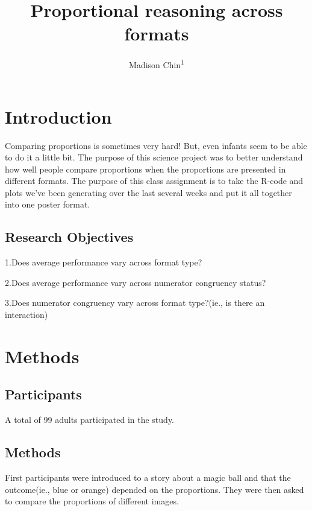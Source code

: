 \documentclass[
  man,floatsintext]{apa6}
\title{Proportional reasoning across formats}
\author{Madison Chin\textsuperscript{1}}
\date{}
\affiliation{\vspace{0.5cm}\textsuperscript{1} Rutgers University}
\begin{document}
\maketitle

\section{Introduction}\label{introduction}

Comparing proportions is sometimes very hard! But, even infants seem to be able to do it a little bit. The purpose of this science project was to better understand how well people compare proportions when the proportions are presented in different formats. The purpose of this class assignment is to take the R-code and plots we've been generating over the last several weeks and put it all together into one poster format.

\subsection{\texorpdfstring{Research Objectives }{Research Objectives  }}\label{research-objectives}

1.Does average performance vary across format type?

2.Does average performance vary across numerator congruency status?

3.Does numerator congruency vary across format type?(ie., is there an interaction)

\section{Methods}\label{methods}

\subsection{\texorpdfstring{Participants}{Participants }}\label{participants}

A total of 99 adults participated in the study.

\subsection{\texorpdfstring{Methods}{Methods }}\label{methods-1}

First participants were introduced to a story about a magic ball and that the outcome(ie., blue or orange) depended on the proportions. They were then asked to compare the proportions of different images.
\end{document}
